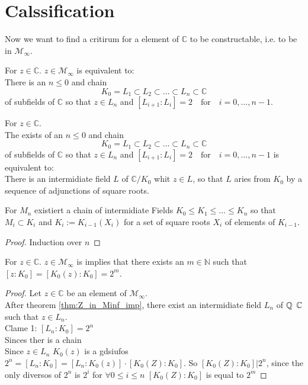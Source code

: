 \section{Calssification}
Now we want to find a critirum for a element of $\mathbb{C}$ to be constructable, i.e. to be in $\mathcal{M}_{\infty}$.

\begin{theorem}
    \label{thm:Z_in_Minf_imp}
    For $z \in \mathbb{C}$. $z \in \mathcal{M}_{\infty}$ is equivalent to:\\
    There is an $n\le 0$ and chain 
    $$K_0 = L_1 \subset L_2 \subset \ldots \subset L_n \subset \mathbb{C}$$
    of subfields of $\mathbb{C}$ so that $z \in L_n$ and 
    $ [L_{i+1}:L_i] = 2 \quad \text{for} \quad i = 0, \ldots, n-1$.
\end{theorem}

\begin{lemma}
    \label{lem:Z_in_Minf_imp_eq} 
    For $z \in \mathbb{C}$. \\
    The exists of an $n\le 0$ and chain 
    $$K_0 = L_1 \subset L_2 \subset \ldots \subset L_n \subset \mathbb{C}$$
    of subfields of $\mathbb{C}$ so that $z \in L_n$ and 
    $ [L_{i+1}:L_i] = 2 \quad \text{for} \quad i = 0, \ldots, n-1$ is equivalent to:\\
    There is an intermidiate field $L$ of $\mathbb{C}/K_0$ whit $z \in L$, so that $L$ aries from $K_0$ by a sequence of adjunctions of square roots.
\end{lemma}

\begin{lemma}
    \label{lem:Mi_chain}
    For $M_n$ existiert a chain of intermidiate Fields $K_0 \le K_1 \le \ldots \le K_n$ so that $M_i\subset K_i$ and $K_i:= K_{i-1}(X_i)$ for a set of square roots $X_i$ of elements of $K_{i-1}$.
\end{lemma}

\begin{proof}
Induction over $n$

\end{proof}

\begin{lemma} 
    \label{lem:Z_in_Minf_imp_eq2}
    For $z \in \mathbb{C}$. $z \in \mathcal{M}_{\infty}$ is implies that there exists an $m \in \mathbb{N}$ such that $[z:K_0] = [K_0(z):K_0]= 2^m$.
\end{lemma}

\begin{proof}  %
    Let $z \in \mathbb{C}$ be an element of  $\mathcal{M}_{\infty}$.\\
    After theorem \ref{thm:Z_in_Minf_imp}, there exist an intermidiate field $L_n$ of $\mathbb{Q}$ $\mathbb{C}$ such that $z\in L_n$.\\
    Clame 1: $[L_n:K_0]= 2^n$\\

    Sinces ther is a chain \\
    Since $z\in L_n$ $K_0(z)$ is a gdsiufos $2^n=[L_n : K_0] = [L_n : K_0(z)] \cdot [K_0(Z):K_0]$.
    So $[K_0(Z):K_0] | 2^n$, since the only diversos of $2^n$ is $2^i$ for $\forall 0\le i \le n$ $[K_0(Z):K_0]$ is equal to $2^m$
\end{proof}

